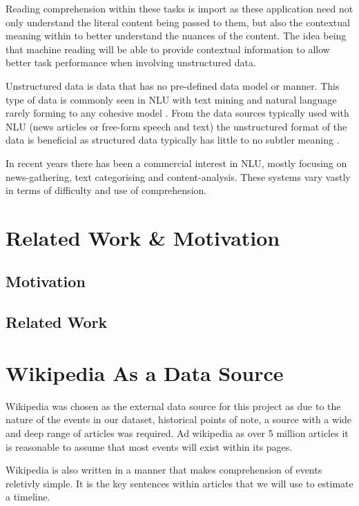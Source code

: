 \documentclass[bsc,frontabs,twoside,singlespacing,parskip,deptreport]{infthesis}     %
\begin{document}
Reading comprehension within these tasks is import as these application need not only understand the literal content
being passed to them, but also the contextual meaning within to better understand the nuances of the content.
The idea being that machine reading will be able to provide contextual information to allow better task performance when
involving unstructured data.

Unstructured data is data that has no pre-defined data model or manner. This type of data is
commonly seen in NLU with text mining and natural language rarely forming to any cohesive model \cite{feldman2007text}.
From the data sources typically used with NLU (news articles or free-form speech and text) the unstructured format of
the data is beneficial as structured data typically has little to no subtler meaning \cite{}.

In recent years there has been a commercial interest in NLU, mostly focusing on news-gathering, text categorising and
content-analysis. These systems vary vastly in terms of difficulty and use of comprehension. 

\chapter{Related Work \& Motivation}
\section{Motivation}
\section{Related Work}


\chapter{Wikipedia As a Data Source}%
Wikipedia was chosen as the external data source for this project as
due to the nature of the events in our dataset, historical points of note,
a source with a wide and deep range of articles was required.
Ad wikipedia as over 5 million articles \cite{} it is reasonable to assume
that most events will exist within its pages.

Wikipedia is also written in a manner that makes comprehension of events reletivly simple.
It is the key sentences within articles that we will use to estimate a timeline.
\end{document}
